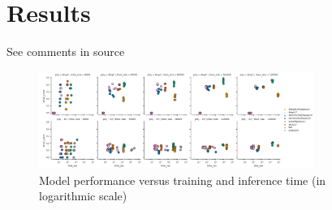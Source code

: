 \section{Results}

See comments in source

\begin{figure}[h]
\centering
\includegraphics[width=0.8\textwidth]{figures/Figure_4.png}
\caption{Model performance versus training and inference time (in logarithmic scale)}
\end{figure}





